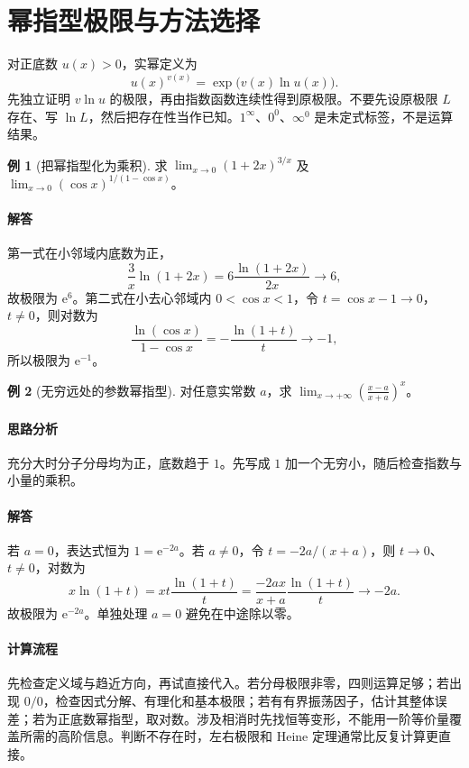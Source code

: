 \documentclass[UTF8,fontset=fandol,12pt,oneside,openany]{ctexrep}
\newcommand{\ee}{\mathrm e}
\theoremstyle{definition}
\newtheorem{example}{例}[chapter]
\begin{document}
\section{幂指型极限与方法选择}
\label{lec:03:power}
对正底数 $u(x)>0$，实幂定义为
\[
u(x)^{v(x)}=\exp\bigl(v(x)\ln u(x)\bigr).
\]
先独立证明 $v\ln u$ 的极限，再由指数函数连续性得到原极限。不要先设原极限 $L$ 存在、写 $\ln L$，然后把存在性当作已知。$1^\infty$、$0^0$、$\infty^0$ 是未定式标签，不是运算结果。

\begin{example}[把幂指型化为乘积]
求 $\lim_{x\to0}(1+2x)^{3/x}$ 及 $\lim_{x\to0}(\cos x)^{1/(1-\cos x)}$。
\end{example}
\paragraph{解答}第一式在小邻域内底数为正，
\[
\frac3x\ln(1+2x)=6\frac{\ln(1+2x)}{2x}\longrightarrow6,
\]
故极限为 $\ee^6$。第二式在小去心邻域内 $0<\cos x<1$，令 $t=\cos x-1\to0$，$t\ne0$，则对数为
\[
\frac{\ln(\cos x)}{1-\cos x}
=-\frac{\ln(1+t)}t\longrightarrow-1,
\]
所以极限为 $\ee^{-1}$。

\begin{example}[无穷远处的参数幂指型]
对任意实常数 $a$，求 $\displaystyle\lim_{x\to+\infty}\left(\frac{x-a}{x+a}\right)^x$。
\end{example}
\paragraph{思路分析}充分大时分子分母均为正，底数趋于 $1$。先写成 $1$ 加一个无穷小，随后检查指数与小量的乘积。
\paragraph{解答}若 $a=0$，表达式恒为 $1=\ee^{-2a}$。若 $a\ne0$，令 $t=-2a/(x+a)$，则 $t\to0$、$t\ne0$，对数为
\[
x\ln(1+t)=xt\frac{\ln(1+t)}t
=\frac{-2ax}{x+a}\frac{\ln(1+t)}t\longrightarrow-2a.
\]
故极限为 $\ee^{-2a}$。单独处理 $a=0$ 避免在中途除以零。

\paragraph{计算流程}
先检查定义域与趋近方向，再试直接代入。若分母极限非零，四则运算足够；若出现 $0/0$，检查因式分解、有理化和基本极限；若有有界振荡因子，估计其整体误差；若为正底数幂指型，取对数。涉及相消时先找恒等变形，不能用一阶等价量覆盖所需的高阶信息。判断不存在时，左右极限和 Heine 定理通常比反复计算更直接。
\end{document}

